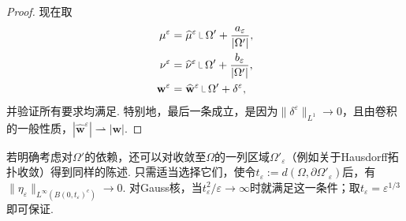 \begin{proof}
现在取
\begin{equation*}
\begin{aligned}
 \mu^\varepsilon&=\widehat\mu^\varepsilon\restr\Omega'
                       +\frac{a_\varepsilon}{|\Omega'|},\\
 \nu^\varepsilon&=\widehat\nu^\varepsilon\restr\Omega'
                       +\frac{b_\varepsilon}{|\Omega'|},\\
 \mathbf w^\varepsilon&=\widehat{\mathbf w}^\varepsilon\restr\Omega'
                       +\delta^\varepsilon,
\end{aligned}
\end{equation*}
并验证所有要求均满足. 特别地，最后一条成立，是因为$\|\delta^\varepsilon\|_{L^1}\to0$，且由卷积的一般性质，$|\widehat{\mathbf w}^\varepsilon|\rightharpoonup|\mathbf w|$.
\end{proof}

\begin{remark}\label{obj:4.9}
若明确考虑对$\Omega'$的依赖，还可以对收敛至$\Omega$的一列区域$\Omega'_\varepsilon$（例如关于Hausdorff拓扑收敛）得到同样的陈述. 只需适当选择它们，使令$t_\varepsilon:=d(\Omega,\partial\Omega'_\varepsilon)$后，有$\|\eta_\varepsilon\|_{L^\infty(B(0,t_\varepsilon)^c)}\to0$. 对Gauss核，当$t_\varepsilon^2/\varepsilon\to\infty$时就满足这一条件；取$t_\varepsilon=\varepsilon^{1/3}$即可保证.
\end{remark}

